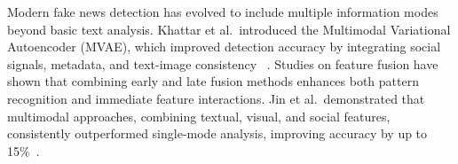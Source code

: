 \documentclass[runningheads]{llncs}
\begin{document}
Modern fake news detection has evolved to include multiple information modes beyond basic text analysis. Khattar et al.~introduced the Multimodal Variational Autoencoder (MVAE), which improved detection accuracy by integrating social signals, metadata, and text-image consistency ~\cite{khattar2019mvae}. Studies on feature fusion have shown that combining early and late fusion methods enhances both pattern recognition and immediate feature interactions. Jin et al.~demonstrated that multimodal approaches, combining textual, visual, and social features, consistently outperformed single-mode analysis, improving accuracy by up to 15\%~\cite{jin2017microblogs}.


\end{document}

